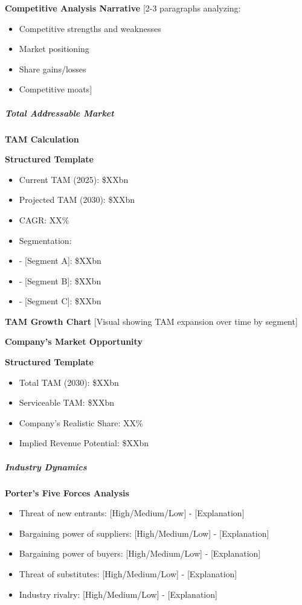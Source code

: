 \documentclass[11pt]{article}
\begin{document}
\textbf{Competitive Analysis Narrative} [2-3 paragraphs analyzing:

\begin{itemize}[leftmargin=*,itemsep=2pt,topsep=2pt]
\item {} Competitive strengths and weaknesses
\item {} Market positioning
\item {} Share gains/losses
\item {} Competitive moats]
\end{itemize}

\subparagraph{Total Addressable Market}\mbox{}\par

\textbf{TAM Calculation}

\textbf{Structured Template}
\begin{itemize}[leftmargin=*,itemsep=2pt,topsep=2pt]
\item {} Current TAM (2025): \$XXbn
\item {} Projected TAM (2030): \$XXbn
\item {} CAGR: XX\%
\item {} Segmentation:
\item {} - [Segment A]: \$XXbn
\item {} - [Segment B]: \$XXbn
\item {} - [Segment C]: \$XXbn
\end{itemize}

\textbf{TAM Growth Chart} [Visual showing TAM expansion over time by segment]


\textbf{Company's Market Opportunity}

\textbf{Structured Template}
\begin{itemize}[leftmargin=*,itemsep=2pt,topsep=2pt]
\item {} Total TAM (2030): \$XXbn
\item {} Serviceable TAM: \$XXbn
\item {} Company's Realistic Share: XX\%
\item {} Implied Revenue Potential: \$XXbn
\end{itemize}

\subparagraph{Industry Dynamics}\mbox{}\par

\textbf{Porter's Five Forces Analysis}

\begin{itemize}[leftmargin=*,itemsep=2pt,topsep=2pt]
\item {} Threat of new entrants: [High/Medium/Low] - [Explanation]
\item {} Bargaining power of suppliers: [High/Medium/Low] - [Explanation]
\item {} Bargaining power of buyers: [High/Medium/Low] - [Explanation]
\item {} Threat of substitutes: [High/Medium/Low] - [Explanation]
\item {} Industry rivalry: [High/Medium/Low] - [Explanation]
\end{itemize}
\end{document}
